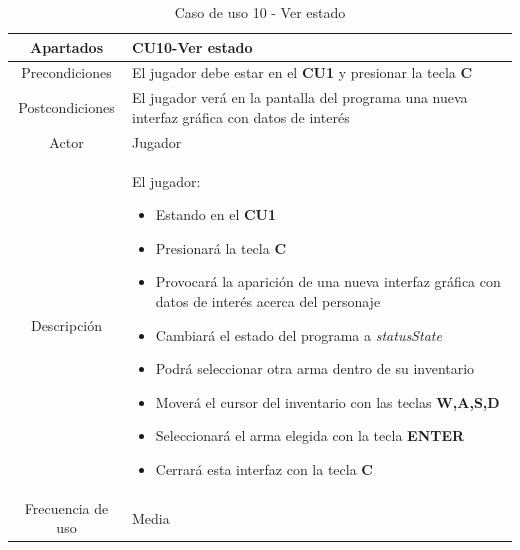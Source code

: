 \documentclass[a4paper]{article}
\begin{document}
\begin{table}[!ht]
    \centering
    \begin{tabular}{|c|p{12cm}|}
        \hline
        \textbf{Apartados} & \textbf{CU10-Ver estado}                                                                      \\
        \hline
        Precondiciones     & El jugador debe estar en el \textbf{CU1} y presionar la tecla \textbf{C}                      \\
        \hline
        Postcondiciones    & El jugador verá en la pantalla del programa una nueva interfaz gráfica con datos de interés   \\
        \hline
        Actor              & Jugador                                                                                       \\
        \hline
        Descripción        & El jugador:
        \begin{itemize}
            \item Estando en el \textbf{CU1}
            \item Presionará la tecla \textbf{C}
            \item[\faAngleRight] Provocará la aparición de una nueva interfaz gráfica con datos de interés acerca del personaje
            \item[\faAngleRight] Cambiará el estado del programa a \textit{statusState}
            \item[\faAngleRight] Podrá seleccionar otra arma dentro de su inventario
            \item[\faAngleRight] Moverá el cursor del inventario con las teclas \textbf{W,A,S,D}
            \item[\faAngleRight] Seleccionará el arma elegida con la tecla \textbf{ENTER}
            \item Cerrará esta interfaz con la tecla \textbf{C}
        \end{itemize} \\
        \hline
        Frecuencia de uso  & Media                                                                                         \\
        \hline
    \end{tabular}
    \caption{Caso de uso 10 - Ver estado}
    \label{tab:casosdeuso10-table}
\end{table}

\clearpage
\end{document}
